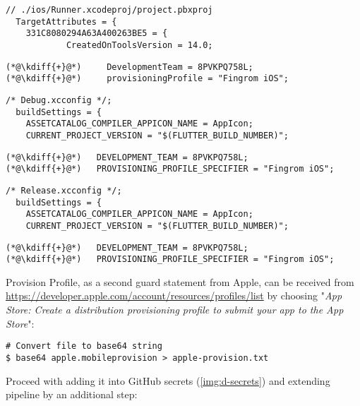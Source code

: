 {
\xpretocmd{\lstlisting}{\vspace{-14pt}}{}{}
\begin{lstlisting}[firstnumber=172]
// ./ios/Runner.xcodeproj/project.pbxproj
  TargetAttributes = {
    331C8080294A63A400263BE5 = {
			CreatedOnToolsVersion = 14.0;
\end{lstlisting}
\begin{lstlisting}[firstnumber=176, backgroundcolor=\color{backgreen}]
(*@\kdiff{+}@*)     DevelopmentTeam = 8PVKPQ758L;
(*@\kdiff{+}@*)     provisioningProfile = "Fingrom iOS";
\end{lstlisting}
\begin{lstlisting}[firstnumber=540]
            /* Debug.xcconfig */;
  buildSettings = {
    ASSETCATALOG_COMPILER_APPICON_NAME = AppIcon;
    CURRENT_PROJECT_VERSION = "$(FLUTTER_BUILD_NUMBER)";
\end{lstlisting}
\begin{lstlisting}[firstnumber=543, backgroundcolor=\color{backgreen}]
(*@\kdiff{+}@*)   DEVELOPMENT_TEAM = 8PVKPQ758L;
(*@\kdiff{+}@*)   PROVISIONING_PROFILE_SPECIFIER = "Fingrom iOS";
\end{lstlisting}
\begin{lstlisting}[firstnumber=564]
            /* Release.xcconfig */;
  buildSettings = {
    ASSETCATALOG_COMPILER_APPICON_NAME = AppIcon;
    CURRENT_PROJECT_VERSION = "$(FLUTTER_BUILD_NUMBER)";
\end{lstlisting}
\begin{lstlisting}[firstnumber=567, backgroundcolor=\color{backgreen}]
(*@\kdiff{+}@*)   DEVELOPMENT_TEAM = 8PVKPQ758L;
(*@\kdiff{+}@*)   PROVISIONING_PROFILE_SPECIFIER = "Fingrom iOS";
\end{lstlisting}
}

\noindent Provision Profile, as a second guard statement from Apple, can be received from
\href{https://developer.apple.com/account/resources/profiles/list}{https://developer.apple.com/account/resources/profiles/list}
by choosing "\emph{App Store: Create a distribution provisioning profile to submit your app to the App Store}":

\begin{lstlisting}[language=terminal]
# Convert file to base64 string
$ base64 apple.mobileprovision > apple-provision.txt
\end{lstlisting}

\noindent Proceed with adding it into GitHub secrets (\cref{img:d-secrets}) and extending pipeline by an additional step:

